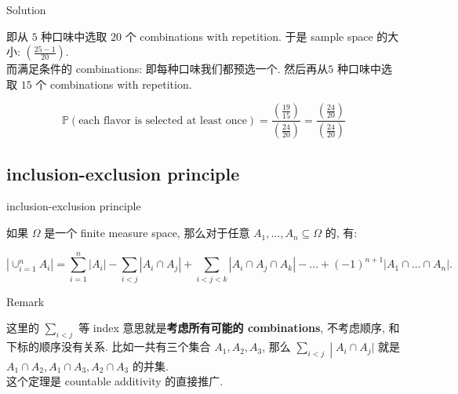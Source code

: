 \documentclass{qlnotes-export}
\begin{document}
\begin{qlsolution}{Solution}

即从 \(5\) 种口味中选取 \(20\) 个 combinations with repetition. 于是 sample space 的大小: \(\left( \frac{25 - 1}{20} \right)\).\\
而满足条件的 combinations: 即每种口味我们都预选一个. 然后再从\(5\) 种口味中选取 \(15\) 个 combinations with repetition.

\[{\mathbb{P}}(\text{each flavor is selected at least once}) = \frac{\left( \frac{19}{15} \right)}{\left( \frac{24}{20} \right)} = \frac{\left( \frac{24}{20} \right)}{\left( \frac{24}{20} \right)}\]

\end{qlsolution}

\subsection{inclusion-exclusion principle}\label{inclusion-exclusion-principle}

\begin{proposition}{inclusion-exclusion principle}\label{prop-01-combinatorics-prob-space-inclusion-exclusion-principle}

如果 \(\Omega\) 是一个 finite measure space, 那么对于任意 \(A_{1},\ldots,A_{n} \subseteq \Omega\) 的, 有:

\[\left| {\cup_{i = 1}^{n}A_{i}} \right| = \sum\limits_{i = 1}^{n}\left| A_{i} \right| - \sum\limits_{i < j}\left| {A_{i} \cap A_{j}} \right| + \sum\limits_{i < j < k}\left| {A_{i} \cap A_{j} \cap A_{k}} \right| - \ldots + ( - 1)^{n + 1}\left| {A_{1} \cap \ldots \cap A_{n}} \right|.\]

\end{proposition}

\begin{qlremark}{Remark}

这里的 \(\sum_{i < j}\) 等 index 意思就是\textbf{考虑所有可能的 combinations}, 不考虑顺序, 和下标的顺序没有关系. 比如一共有三个集合 \(A_{1},A_{2},A_{3}\), 那么 \(\left. \sum_{i < j} \middle| A_{i} \cap A_{j}| \right.\) 就是 \(A_{1} \cap A_{2},A_{1} \cap A_{3},A_{2} \cap A_{3}\) 的并集.\\
这个定理是 countable additivity 的直接推广.

\end{qlremark}
\end{document}
